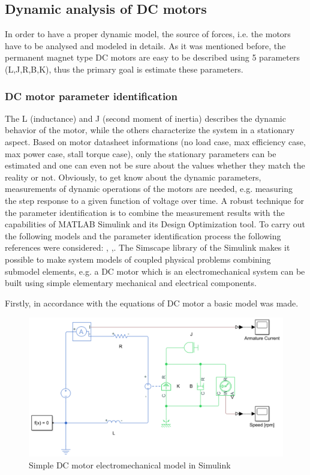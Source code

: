 \documentclass[12pt,english,twoside]{article}
\begin{document}
\subsection{Dynamic analysis of DC motors}
In order to have a proper dynamic model, the source of forces, i.e. the motors have to be analysed and modeled in details. As it was mentioned before, the permanent magnet type DC motors are easy to be described using 5 parameters (L,J,R,B,K), thus the primary goal is estimate these parameters.
\subsubsection{DC motor parameter identification}
The L (inductance) and J (second moment of inertia) describes the dynamic behavior of the motor, while the others characterize the system in a stationary aspect. Based on motor datasheet informations (no load case, max efficiency case, max power case, stall torque case), only the stationary parameters can be estimated and one can even not be sure about the values whether they match the reality or not. Obviously, to get know about the dynamic parameters, measurements of dynamic operations of the motors are needed, e.g. measuring the step response to a given function of voltage over time. A robust technique for the parameter identification is to combine the measurement results with the capabilities of MATLAB Simulink and its Design Optimization tool. To carry out the following models and the parameter identification process the following references were considered: \cite{par_est_1}, \cite{par_est_2},\cite{par_est_3}. The Simscape library of the Simulink makes it possible to make system models of coupled physical problems combining submodel elements, e.g. a DC motor which is an electromechanical system can be built using simple elementary mechanical and electrical components.

Firstly, in accordance with the equations of DC motor a basic model was made.
\begin{figure}[htb!]
	\centering
	\includegraphics[width=\textwidth]{figures/simulink_dc_motor.png}
	\caption{Simple DC motor electromechanical model in Simulink}
	\label{simulink_dc_motor}
\end{figure}
\end{document}
